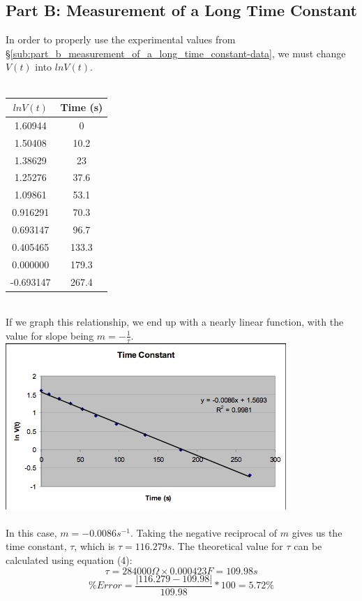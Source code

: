 \documentclass[titlepage]{article}
\begin{document}
\subsection{Part B: Measurement of a Long Time Constant}\label{sub:part_b_measurement_of_a_long_time_constant-analysis}
In order to properly use the experimental values from \S \ref{sub:part_b_measurement_of_a_long_time_constant-data}, we must change $V(t)$ into $ln V(t)$.\\
\\
\begin{tabular}{cc}
\hline
$ln V(t)$ & Time (s)\\
\hline
1.60944 & 0\\
\hline
1.50408 & 10.2\\
\hline
1.38629 & 23\\
\hline
1.25276 & 37.6\\
\hline
1.09861 & 53.1\\
\hline
0.916291 & 70.3\\
\hline
0.693147 & 96.7\\
\hline
0.405465 & 133.3\\
\hline
0.000000 & 179.3\\
\hline
-0.693147 & 267.4\\
\hline
\end{tabular}\\
If we graph this relationship, we end up with a nearly linear function, with the value for slope being $m = -\frac{1}{\tau}$.\\
\includegraphics{1.jpg}\\
\\
In this case, $m = -0.0086s^{-1}$. Taking the negative reciprocal of $m$ gives us the time constant, $\tau$, which is $\tau = 116.279 s$. The theoretical value for $\tau$ can be calculated using equation (4):
\[
	\tau = 284000 \Omega \times 0.000423 F = 109.98s
\]
\[
	\% Error = \frac{|116.279 - 109.98|}{109.98} * 100 = 5.72 \%
\]
\end{document}
